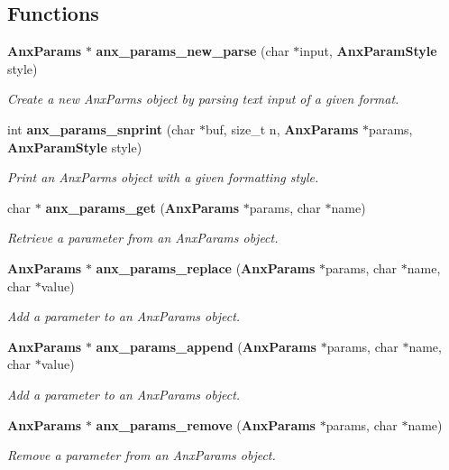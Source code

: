 \subsection*{Functions}
\begin{CompactItemize}
\item 
{\bf Anx\-Params} $\ast$ {\bf anx\_\-params\_\-new\_\-parse} (char $\ast$input, {\bf Anx\-Param\-Style} style)
\begin{CompactList}\small\item\em Create a new Anx\-Parms object by parsing text input of a given format. \item\end{CompactList}\item 
int {\bf anx\_\-params\_\-snprint} (char $\ast$buf, size\_\-t n, {\bf Anx\-Params} $\ast$params, {\bf Anx\-Param\-Style} style)
\begin{CompactList}\small\item\em Print an Anx\-Parms object with a given formatting style. \item\end{CompactList}\item 
char $\ast$ {\bf anx\_\-params\_\-get} ({\bf Anx\-Params} $\ast$params, char $\ast$name)
\begin{CompactList}\small\item\em Retrieve a parameter from an Anx\-Params object. \item\end{CompactList}\item 
{\bf Anx\-Params} $\ast$ {\bf anx\_\-params\_\-replace} ({\bf Anx\-Params} $\ast$params, char $\ast$name, char $\ast$value)
\begin{CompactList}\small\item\em Add a parameter to an Anx\-Params object. \item\end{CompactList}\item 
{\bf Anx\-Params} $\ast$ {\bf anx\_\-params\_\-append} ({\bf Anx\-Params} $\ast$params, char $\ast$name, char $\ast$value)
\begin{CompactList}\small\item\em Add a parameter to an Anx\-Params object. \item\end{CompactList}\item 
{\bf Anx\-Params} $\ast$ {\bf anx\_\-params\_\-remove} ({\bf Anx\-Params} $\ast$params, char $\ast$name)
\begin{CompactList}\small\item\em Remove a parameter from an Anx\-Params object. \item\end{CompactList}\item 

\end{CompactItemize}
